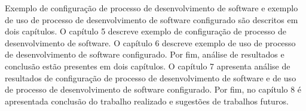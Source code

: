 Exemplo de configuração de processo de desenvolvimento de software e exemplo de uso de processo de desenvolvimento de software configurado são descritos em dois capítulos. O capítulo 5 descreve exemplo de configuração de processo de desenvolvimento de software. O capítulo 6 descreve exemplo de uso de processo de desenvolvimento de software configurado. Por fim, análise de resultados e conclusão estão presentes em dois capítulos. O capítulo 7 apresenta análise de resultados de configuração de processo de desenvolvimento de software e de uso de processo de desenvolvimento de software configurado. Por fim, no capítulo 8 é apresentada conclusão do trabalho realizado e sugestões de trabalhos futuros.
